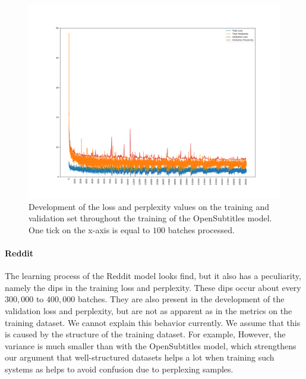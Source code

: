 \begin{figure}[H]
	\includegraphics[width=\linewidth]{img/plots/opensubtitles_not_reversed/train_metrics.png}
	\caption{Development of the loss and perplexity values on the training and validation set throughout the training of the OpenSubtitles model. One tick on the x-axis is equal to $100$ batches processed.}
	\label{results:learning_process:metrics:opensubtitles}
\end{figure}

\paragraph{Reddit} The learning process of the Reddit model looks find, but it also has a peculiarity, namely the dips in the training loss and perplexity. These dips occur about every $300,000$ to $400,000$ batches. They are also present in the development of the validation loss and perplexity, but are not as apparent as in the metrics on the training dataset. We cannot explain this behavior currently. We assume that this is caused by the structure of the training dataset. For example,  However, the variance is much smaller than with the OpenSubtitles model, which strengthens our argument that well-structured datasets helps a lot when training such systems as helps to avoid confusion due to perplexing samples.

